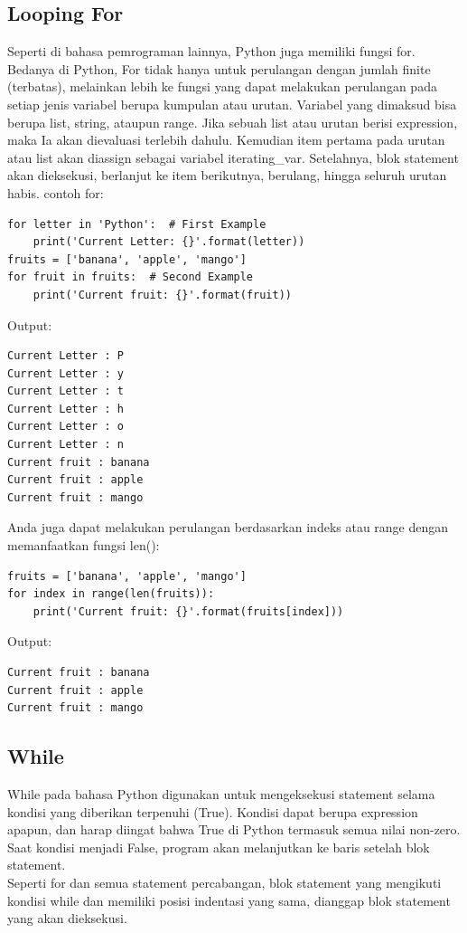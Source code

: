 \subsection{Looping For}
Seperti di bahasa pemrograman lainnya, Python juga memiliki fungsi for. Bedanya di Python, For tidak hanya untuk perulangan dengan jumlah finite (terbatas), melainkan lebih ke fungsi yang dapat melakukan perulangan pada setiap jenis variabel berupa kumpulan atau urutan. Variabel yang dimaksud bisa berupa list, string, ataupun range. Jika sebuah list atau urutan berisi expression, maka Ia akan dievaluasi terlebih dahulu. Kemudian item pertama pada urutan atau list akan diassign sebagai variabel iterating\_var. Setelahnya, blok statement akan dieksekusi, berlanjut ke item berikutnya, berulang, hingga seluruh urutan habis.
contoh for:
\begin{verbatim}
for letter in 'Python':  # First Example
    print('Current Letter: {}'.format(letter))
fruits = ['banana', 'apple', 'mango']
for fruit in fruits:  # Second Example
    print('Current fruit: {}'.format(fruit))
\end{verbatim}
Output:
\begin{verbatim}
Current Letter : P
Current Letter : y
Current Letter : t
Current Letter : h
Current Letter : o
Current Letter : n
Current fruit : banana
Current fruit : apple
Current fruit : mango
\end{verbatim}
Anda juga dapat melakukan perulangan berdasarkan indeks atau range dengan memanfaatkan fungsi len():
\begin{verbatim}
fruits = ['banana', 'apple', 'mango']
for index in range(len(fruits)):
    print('Current fruit: {}'.format(fruits[index]))
\end{verbatim}
Output:
\begin{verbatim}
Current fruit : banana
Current fruit : apple
Current fruit : mango
\end{verbatim}

\subsection{While}
While pada bahasa Python digunakan untuk mengeksekusi statement selama kondisi yang diberikan terpenuhi (True). Kondisi dapat berupa expression apapun, dan harap diingat bahwa True di Python termasuk semua nilai non-zero. Saat kondisi menjadi False, program akan melanjutkan ke baris setelah blok statement.\\
Seperti for dan semua statement percabangan, blok statement yang mengikuti kondisi while dan memiliki posisi indentasi yang sama, dianggap blok statement yang akan dieksekusi.

